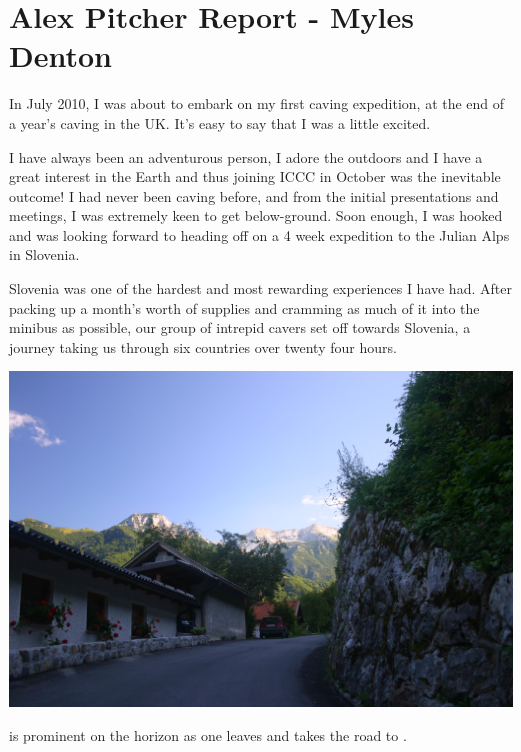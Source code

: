 \section{Alex Pitcher Report - Myles Denton}



In July 2010, I was about to embark on my first caving expedition, at the end of a year's caving in the UK. It's easy to say that I was a little excited.


I have always been an adventurous person, I adore the outdoors and I have a great interest in the
Earth and thus joining ICCC in October was the inevitable outcome! I had never been caving before,
and from the initial presentations and meetings, I was extremely keen to get below-ground. Soon
enough, I was hooked and was looking forward to heading off on a 4 week expedition to the Julian
Alps in Slovenia.


Slovenia was one of the hardest and most rewarding experiences I have had. After packing up
a month's worth of supplies and cramming as much of it into the minibus as possible, our group of
intrepid cavers set off towards Slovenia, a journey taking us through six countries over twenty four
hours.


\begin{pagefigure}
\checkoddpage \ifoddpage \forcerectofloat \else \forceversofloat \fi
   \centering
\includegraphics[width = \textwidth]{2010/expo_stories/20100731-14-22-42 - Tharatorn Supasiti - IMG_6366 --orig.jpg}
\caption{\protect{} is prominent on the horizon as one leaves \protect{} and takes the road to \protect{}. } \label{leaving tolmin}
\end{pagefigure}

